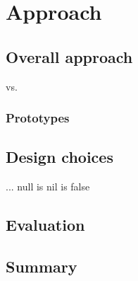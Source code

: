\chapter{Approach}
\section{Overall approach}
\cite{waterfall} vs. \cite{stepwise-refinement}
\subsection{Prototypes}
\section{Design choices}
... null is nil is false
\section{Evaluation}
\section{Summary}
